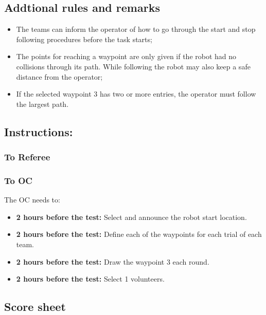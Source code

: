 \subsection*{Addtional rules and remarks}
\begin{itemize}[nosep]
	\item The teams can inform the operator of how to go through the start and stop following procedures before the task starts;
	\item The points for reaching a waypoint are only given if the robot had no collisions through its path. While following the robot may also keep a safe distance from the operator;
	\item If the selected waypoint 3 has two or more entries, the operator must follow the largest path.
\end{itemize}

\subsection*{Instructions:}
\subsubsection*{To Referee}


\subsubsection*{To OC}
The OC needs to:
\begin{itemize}
	\item \textbf{2 hours before the test:} Select and announce the robot start location.
	\item \textbf{2 hours before the test:} Define each of the waypoints for each trial of each team.
    \item \textbf{2 hours before the test:} Draw the waypoint 3 each round.
	\item \textbf{2 hours before the test:} Select 1 volunteers.
\end{itemize}

\newpage
\subsection*{Score sheet}

